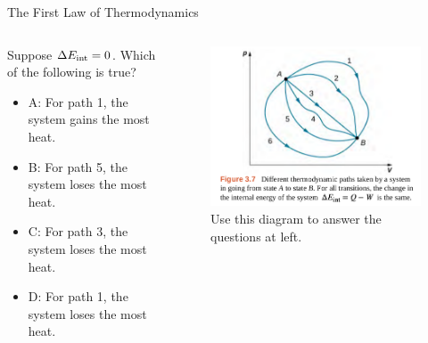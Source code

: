\documentclass{beamer}
\begin{document}
\begin{frame}{The First Law of Thermodynamics}
\begin{columns}[T]
\begin{column}{0.5\textwidth}
\small Suppose $\Delta E_{\rm int} = 0$.  Which of the following is true?
\begin{itemize}
\item A: For path 1, the system gains the most heat.
\item B: For path 5, the system loses the most heat.
\item C: For path 3, the system loses the most heat.
\item D: For path 1, the system loses the most heat.
\end{itemize}
\end{column}
\begin{column}{0.5\textwidth}
\begin{figure}
\centering
\includegraphics[width=\textwidth]{figures/states1.png}
\caption{\label{fig:states3} Use this diagram to answer the questions at left.}
\end{figure}
\end{column}
\end{columns}
\end{frame}
\end{document}
